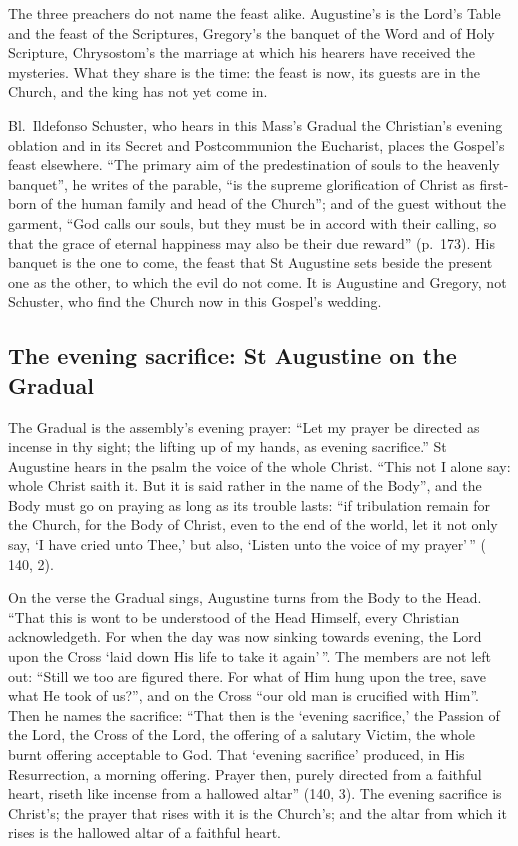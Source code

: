 The three preachers do not name the feast alike. Augustine's is the Lord's
Table and the feast of the Scriptures, Gregory's the banquet of the Word and of
Holy Scripture, Chrysostom's the marriage at which his hearers have received
the mysteries. What they share is the time: the feast is now, its guests are
in the Church, and the king has not yet come in.

Bl.\ Ildefonso Schuster, who hears in this Mass's Gradual the Christian's
evening oblation and in its Secret and Postcommunion the Eucharist, places the
Gospel's feast elsewhere. ``The primary aim
of the predestination of souls to the heavenly banquet'', he writes of the
parable, ``is the supreme glorification of Christ as first-born of the human
family and head of the Church''; and of the guest without the garment, ``God
calls our souls, but they must be in accord with their calling, so that the
grace of eternal happiness may also be their due reward'' (p.~173). His banquet
is the one to come, the feast that St Augustine sets beside the present one as
the other, to which the evil do not come. It is Augustine and Gregory, not
Schuster, who find the Church now in this Gospel's wedding.

\subsection{The evening sacrifice: St Augustine on the Gradual}

The Gradual is the assembly's evening prayer: ``Let my prayer be directed as
incense in thy sight; the lifting up of my hands, as evening sacrifice.'' St
Augustine hears in the psalm the voice of the whole Christ. ``This not I alone
say: whole Christ saith it. But it is said rather in the name of the Body'',
and the Body must go on praying as long as its trouble lasts: ``if tribulation
remain for the Church, for the Body of Christ, even to the end of the world,
let it not only say, `I have cried unto Thee,' but also, `Listen unto the voice
of my prayer'\,'' ( 140, 2).

On the verse the Gradual sings, Augustine turns from the Body to the Head. ``That
this is wont to be understood of the Head Himself, every Christian
acknowledgeth. For when the day was now sinking towards evening, the Lord upon
the Cross `laid down His life to take it again'\,''. The members are not left
out: ``Still we too are figured there. For what of Him hung upon the tree, save
what He took of us?'', and on the Cross ``our old man is crucified with Him''.
Then he names the sacrifice: ``That then is the `evening sacrifice,' the
Passion of the Lord, the Cross of the Lord, the offering of a salutary Victim,
the whole burnt offering acceptable to God. That `evening sacrifice' produced,
in His Resurrection, a morning offering. Prayer then, purely directed from a
faithful heart, riseth like incense from a hallowed altar'' (140, 3). The
evening sacrifice is Christ's; the prayer that rises with it is the Church's;
and the altar from which it rises is the hallowed altar of a faithful heart.


